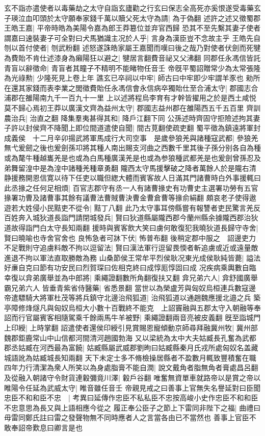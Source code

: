玄不詣亦遣使者以毒藥劫之太守自詣玄廬勸之行玄曰保志全高死亦奚恨遂受毒藥玄子瑛泣血叩頭於太守願奉家錢千萬以贖父死太守為請|{
	為于偽翻}
述許之述又徵蜀郡王皓王嘉|{
	平帝時皓為美陽令嘉為郎王莽簒位並弃官西歸}
恐其不至先繫其妻子使者謂嘉曰速裝妻子可全對曰犬馬猶識主况於人乎|{
	言身為漢臣豈不念故主乎}
王皓先自刎以首付使者|{
	刎武粉翻}
述怒遂誅皓家屬王嘉聞而嘆曰後之哉乃對使者伏劍而死犍為費貽不肯仕述漆身為癩陽狂以避之|{
	犍居言翻費音祕又父沸翻}
同郡任永馮信皆託青盲以辭徵命|{
	青盲者其瞳子不精明不能睹物任音壬}
帝旣平蜀詔贈常少為太常張隆為光祿勲|{
	少隆死見上卷上年}
譙玄已卒祠以中牢|{
	師古曰中牢即少牢謂羊豕也}
勑所在還其家錢而表李業之閭徵費貽任永馮信會永信病卒獨貽仕至合浦太守|{
	郡國志合浦郡在雒陽南九千一百九十一里}
上以述將程烏李育有才幹皆擢用之於是西土咸悦莫不歸心焉初王莽以廣漢文齊為益州太守|{
	郡國志益州郡在雒陽西五千五百里}
齊訓農治兵|{
	治直之翻}
降集羣夷甚得其和|{
	降戶江翻下同}
公孫述時齊固守拒險述拘其妻子許以封侯齊不降聞上即位間道遣使自聞|{
	間古莧翻使疏吏翻}
蜀平徵為鎮遠將軍封成義侯　十二月辛卯揚武將軍馬成行大司空事　是歲參狼羌與諸種寇武都|{
	參狼羌無弋爰劒之後也爰劍孫卭將其種人南出賜支河曲之西數千里其後子孫分别各自為種或為氂牛種越巂羌是也或為白馬種廣漢羌是也或為参狼種武都羌是也爰劍曾孫忍及弟舞留湟中是為湟中諸種羌種章勇翻}
隴西太守馬援擊破之降者萬餘人於是隴右清静援務開恩信寛以待下任吏以職但緫大體而賓客故人日滿其門諸曹時白外事援輒曰此丞掾之任何足相煩|{
	百官志郡守有丞一人有諸曹掾史有功曹史主選署功勞有五官掾署功曹及諸曹事其餘有議曹法曹賊曹決曹金曹倉曹等掾俞絹翻}
頗哀老子使得遨遊若大姓侵小民黠吏不從令|{
	黠丁八翻}
此乃太守事耳傍縣嘗有報讐者吏民驚言羌反百姓奔入城狄道長詣門請閉城發兵|{
	賢曰狄道縣屬隴西郡今蘭州縣余據隴西郡治狄道故得詣門白太守長知兩翻}
援時與賓客飲大笑曰虜何敢復犯我曉狄道長歸守寺舍|{
	賢曰曉喻也寺舍官舍也}
良怖急者可牀下伏|{
	怖普布翻}
後稍定郡中服之　詔邊吏力不足戰則守追虜料敵不拘以逗留法|{
	賢曰漢法軍行逗留畏愞者斬追虜或近或遠量敵進退不拘以軍法直取勝敵為務}
山桑節侯王常牟平烈侯耿况東光成侯耿純皆薨|{
	謚法好亷自克曰節有功安民曰烈賀琛曰佐相克終曰成惇厖惇固曰成}
况疾病乘輿數自臨幸復以弇弟廣舉並為中郎將|{
	乘繩證翻數所角翻復扶又翻}
弇兄弟六人|{
	弇舒國廣舉霸兄弟六人}
皆垂青紫省侍醫藥|{
	省悉景翻}
當世以為榮盧芳與匈奴烏桓連兵數寇邊帝遣驃騎大將軍杜茂等將兵鎮守北邊治飛狐道|{
	治飛狐道以通趙魏應援北邉之兵}
築亭障修烽燧凡與匈奴烏桓大小數十百戰終不能克　上詔竇融與五郡太守入朝融等奉詔而行官屬賓客相隨駕乘千餘兩馬牛羊被野|{
	乘繩證翻兩音亮被皮義翻}
旣至詣城門上印綬|{
	上時掌翻}
詔遣使者還侯印綬引見賞賜恩寵傾動京師尋拜融冀州牧|{
	冀州部魏郡鉅鹿常山中山信都河間清河趙國勃海}
又以梁統為太中大夫姑臧長孔奮為武都郡丞姑臧在河西最為富饒|{
	姑臧縣屬武威郡劉昫曰姑臧縣秦月氏戎所處匈奴名盖藏城語訛為姑臧城長知兩翻}
天下未定士多不脩檢操居縣者不盈數月輒致豐積奮在職四年力行清潔為衆人所笑以為身處脂膏不能自潤|{
	說文戴角者脂無角者膏處昌呂翻}
及從融入朝諸守令財貨連轂彌竟川澤|{
	轂戶谷翻}
唯奮無資單車就路帝以是賞之帝以睢陽令任延為武威太守|{
	睢音雖任音壬}
帝親見戒之曰善事上官無失名譽延對曰臣聞忠臣不和和臣不忠　|{
	考異曰延傳作忠臣不私私臣不忠按高峻小史作忠臣不和和臣不忠意思為長又與上語相應今從之}
履正奉公臣子之節上下雷同非陛下之福|{
	曲禮曰毋雷同鄭氏註曰雷之發聲物無不同時應者人之言當各由已不當然也}
善事上官臣不敢奉詔帝歎息曰卿言是也

